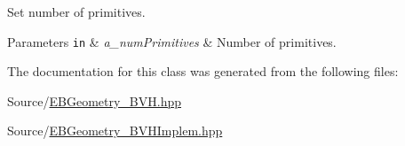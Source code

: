 Set number of primitives. 


\begin{DoxyParams}[1]{Parameters}
\mbox{\tt in}  & {\em a\+\_\+num\+Primitives} & Number of primitives. \\
\hline
\end{DoxyParams}


The documentation for this class was generated from the following files\+:\begin{DoxyCompactItemize}
\item 
Source/\hyperlink{EBGeometry__BVH_8hpp}{E\+B\+Geometry\+\_\+\+B\+V\+H.\+hpp}\item 
Source/\hyperlink{EBGeometry__BVHImplem_8hpp}{E\+B\+Geometry\+\_\+\+B\+V\+H\+Implem.\+hpp}\end{DoxyCompactItemize}
